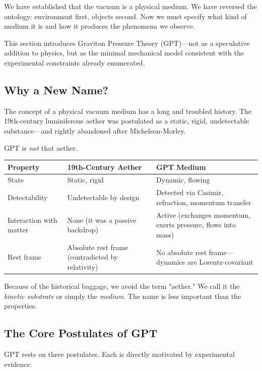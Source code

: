 \documentclass[12pt, a4paper]{article}
\begin{document}
We have established that the vacuum is a physical medium. We have reversed the ontology: environment first, objects second. Now we must specify what kind of medium it is and how it produces the phenomena we observe.

This section introduces Graviton Pressure Theory (GPT)—not as a speculative addition to physics, but as the minimal mechanical model consistent with the experimental constraints already enumerated.

\subsection{Why a New Name?}
\label{subsec:new_name}

The concept of a physical vacuum medium has a long and troubled history. The 19th-century luminiferous aether was postulated as a static, rigid, undetectable substance—and rightly abandoned after Michelson-Morley.

GPT is \textit{not} that aether.

\begin{center}
\begin{tabular}{|p{3.5cm}|p{5cm}|p{5cm}|}
\hline
\textbf{Property} & \textbf{19th-Century Aether} & \textbf{GPT Medium} \\
\hline
State & Static, rigid & Dynamic, flowing \\
\hline
Detectability & Undetectable by design & Detected via Casimir, refraction, momentum transfer \\
\hline
Interaction with matter & None (it was a passive backdrop) & Active (exchanges momentum, exerts pressure, flows into mass) \\
\hline
Rest frame & Absolute rest frame (contradicted by relativity) & No absolute rest frame—dynamics are Lorentz-covariant \\
\hline
\end{tabular}
\end{center}

Because of the historical baggage, we avoid the term "aether." We call it the \textit{kinetic substrate} or simply the \textit{medium}. The name is less important than the properties.

\subsection{The Core Postulates of GPT}
\label{subsec:core_postulates}

GPT rests on three postulates. Each is directly motivated by experimental evidence.
\end{document}
